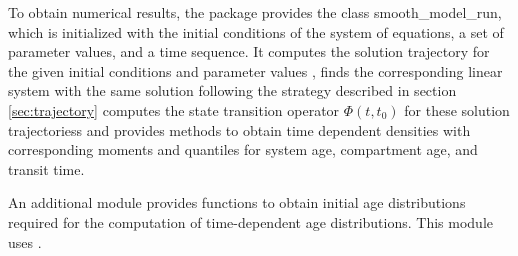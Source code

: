 To obtain numerical results, the package
provides the class smooth\_model\_run, which is initialized with the initial
conditions of the system of equations, a set of parameter values, and a time
sequence. It computes the solution trajectory for the given initial conditions and
parameter values , finds the corresponding linear system with the same solution
following the strategy described in section \ref{sec:trajectory} computes the
state transition operator $\Phi(t, t_0)$ for these solution trajectoriess and 
provides methods to obtain time dependent densities with corresponding moments and quantiles for system age, compartment age, and transit time. 

An additional module provides functions to obtain initial age distributions
required for the computation of time-dependent age distributions. 
This module uses \LAPM.

